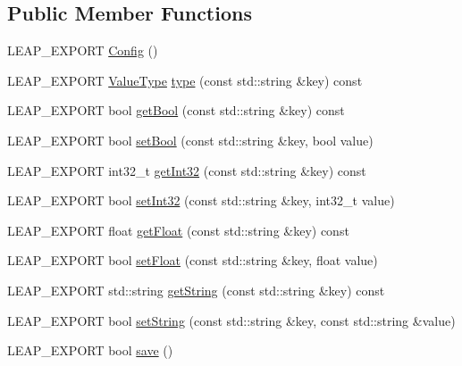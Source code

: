 \subsection*{Public Member Functions}
\begin{DoxyCompactItemize}
\item 
L\+E\+A\+P\+\_\+\+E\+X\+P\+O\+R\+T \hyperlink{class_leap_1_1_config_aee58922e575e3e59ddf8da5af4f07878}{Config} ()
\item 
L\+E\+A\+P\+\_\+\+E\+X\+P\+O\+R\+T \hyperlink{class_leap_1_1_config_aee9819af7eacacc324aa72619310a9d8}{Value\+Type} \hyperlink{class_leap_1_1_config_ac5ed7b7b0562cc4dae2d0b4ab8187b12}{type} (const std\+::string \&key) const 
\item 
L\+E\+A\+P\+\_\+\+E\+X\+P\+O\+R\+T bool \hyperlink{class_leap_1_1_config_a52200e2fe5473caf1c0dbc91e0733c0c}{get\+Bool} (const std\+::string \&key) const 
\item 
L\+E\+A\+P\+\_\+\+E\+X\+P\+O\+R\+T bool \hyperlink{class_leap_1_1_config_ac6a084454142d87f1662b3b279dfe9e9}{set\+Bool} (const std\+::string \&key, bool value)
\item 
L\+E\+A\+P\+\_\+\+E\+X\+P\+O\+R\+T int32\+\_\+t \hyperlink{class_leap_1_1_config_a135ebf47e6a3a803527a7cc035029cb0}{get\+Int32} (const std\+::string \&key) const 
\item 
L\+E\+A\+P\+\_\+\+E\+X\+P\+O\+R\+T bool \hyperlink{class_leap_1_1_config_a47d811c2727695ecd1916e313b54736c}{set\+Int32} (const std\+::string \&key, int32\+\_\+t value)
\item 
L\+E\+A\+P\+\_\+\+E\+X\+P\+O\+R\+T float \hyperlink{class_leap_1_1_config_ace93b634211d8cf237c9d40a2e497b44}{get\+Float} (const std\+::string \&key) const 
\item 
L\+E\+A\+P\+\_\+\+E\+X\+P\+O\+R\+T bool \hyperlink{class_leap_1_1_config_a6d9442a88f622b00f9c432c4ac9b7c35}{set\+Float} (const std\+::string \&key, float value)
\item 
L\+E\+A\+P\+\_\+\+E\+X\+P\+O\+R\+T std\+::string \hyperlink{class_leap_1_1_config_a4b408ca65a8b7064733e26be93af3f2d}{get\+String} (const std\+::string \&key) const 
\item 
L\+E\+A\+P\+\_\+\+E\+X\+P\+O\+R\+T bool \hyperlink{class_leap_1_1_config_a5cd3b0eaf702cc304071c244a52b3bed}{set\+String} (const std\+::string \&key, const std\+::string \&value)
\item 
L\+E\+A\+P\+\_\+\+E\+X\+P\+O\+R\+T bool \hyperlink{class_leap_1_1_config_ae1187e2b9992706d2a3eb071cc2f71c4}{save} ()
\end{DoxyCompactItemize}
